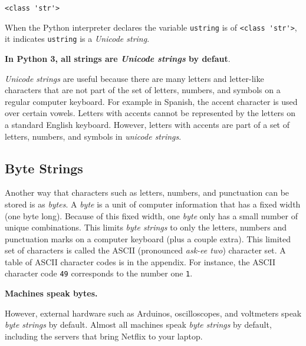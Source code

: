 \documentclass{book}
\newcommand{\passthrough}[1]{#1}
\begin{document}
    \begin{Verbatim}[commandchars=\\\{\}]
<class 'str'>

    \end{Verbatim}


    
        When the Python interpreter declares the variable
\passthrough{\lstinline!ustring!} is of
\passthrough{\lstinline!<class 'str'>!}, it indicates
\passthrough{\lstinline!ustring!} is a \emph{Unicode string}.

\textbf{In Python 3, all strings are \emph{Unicode strings} by defaut}.

\emph{Unicode strings} are useful because there are many letters and
letter-like characters that are not part of the set of letters, numbers,
and symbols on a regular computer keyboard. For example in Spanish, the
accent character is used over certain vowels. Letters with accents
cannot be represented by the letters on a standard English keyboard.
However, letters with accents are part of a set of letters, numbers, and
symbols in \emph{unicode strings}.
    




    
        \hypertarget{byte-strings}{%
\subsection{Byte Strings}\label{byte-strings}}

Another way that characters such as letters, numbers, and punctuation
can be stored is as \emph{bytes}. A \emph{byte} is a unit of computer
information that has a fixed width (one byte long). Because of this
fixed width, one \emph{byte} only has a small number of unique
combinations. This limits \emph{byte strings} to only the letters,
numbers and punctuation marks on a computer keyboard (plus a couple
extra). This limited set of characters is called the ASCII (pronounced
\emph{ask-ee two}) character set. A table of ASCII character codes is in
the appendix. For instance, the ASCII character code
\passthrough{\lstinline!49!} corresponds to the number one
\passthrough{\lstinline!1!}.

\textbf{Machines speak bytes.}

However, external hardware such as Arduinos, oscilloscopes, and
voltmeters speak \emph{byte strings} by default. Almost all machines
speak \emph{byte strings} by default, including the servers that bring
Netflix to your laptop.
    
\end{document}
